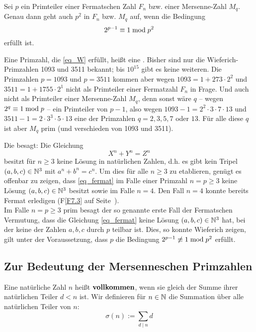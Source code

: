 \setcounter{falko}{2}
\begin{falko} \label{F7.3}
	Sei $p$ ein Primteiler einer Fermatschen Zahl $F_n$ bzw. einer Mersenne-Zahl $M_q$. Genau dann geht auch $p^2$ in $F_n$ bzw. $M_q$ auf, wenn die Bedingung 
	\begin{equation}
		2^{p-1} \equiv 1 \bmod p^2 \label{eq_W}
	\end{equation}
	erfüllt ist.
\end{falko}

Eine Primzahl, die \eqref{eq_W} erfüllt, heißt eine . Bisher sind nur die Wieferich-Primzahlen 1093 und 3511 bekannt; bis $10^{15}$ gibt es keine weiteren. Die Primzahlen $p = 1093$ und $p = 3511$ kommen aber wegen $1093 = 1 + 273 \cdot 2^2$ und $3511 = 1 + 1755 \cdot 2^1$ nicht als Primteiler einer Fermatzahl $F_n$ in Frage. Und auch nicht als Primteiler einer Mersenne-Zahl $M_q$, denn sonst wäre $q$ -- wegen $2^q \equiv 1 \bmod p$ -- ein Primteiler von $p-1$, also wegen $1093 - 1 = 2^2 \cdot 3 \cdot 7 \cdot 13$ und $3511 - 1 = 2 \cdot 3^3 \cdot 5 \cdot 13$ eine der Primzahlen $q = 2,3,5,7$ oder $13$. Für alle diese $q$ ist aber $M_q$ prim (und verschieden von 1093 und 3511).

	Die  besagt: Die Gleichung
	\begin{equation}
		X^n + Y^n = Z^n \label{eq_fermat}
	\end{equation}
	besitzt für $n \geq 3$ keine Lösung in natürlichen Zahlen, d.h. es gibt kein Tripel $(a,b,c) \in \mathbb{N}^3$ mit $a^n+b^n=c^n$. Um dies für alle $n \geq 3$ zu etablieren, genügt es offenbar zu zeigen, dass \eqref{eq_fermat} im Falle einer Primzahl $n = p \geq 3$ keine Lösung $(a,b,c) \in \mathbb{N}^3$ besitzt sowie im Falle $n = 4$. Den Fall $n = 4$ konnte bereits Fermat erledigen (F\ref{F7.3} auf Seite~\pageref{F7.3}). \\
	Im Falle $n = p \geq 3$ prim besagt der so genannte erste Fall der Fermatschen Vermutung, dass die Gleichung \eqref{eq_fermat} keine Lösung $(a,b,c) \in \mathbb{N}^3$ hat, bei der keine der Zahlen $a,b,c$ durch $p$ teilbar ist. Dies, so konnte Wieferich zeigen, gilt unter der Voraussetzung, dass $p$ die Bedingung $2^{p-1} \not\equiv 1 \bmod p^2$ erfüllt.

\subsection{Zur Bedeutung der Mersenneschen Primzahlen}
\begin{defn}
	Eine natürliche Zahl $n$ heißt $\Index{vollkommen}$, wenn sie gleich der Summe ihrer natürlichen Teiler $d < n$ ist. Wir definieren für $n \in \mathbb{N}$ die Summation über alle natürlichen Teiler von $n$:
	\[ \sigma(n) := \sum_{d \mid n} d \]
\end{defn}


